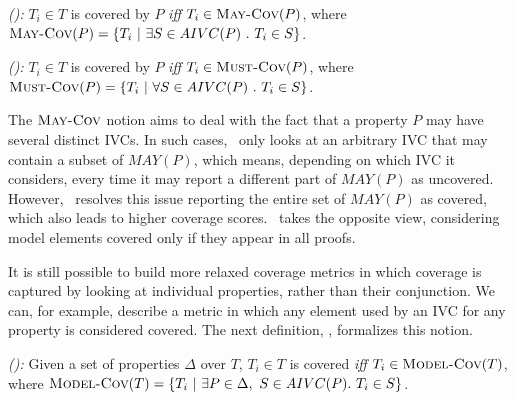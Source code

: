 \begin{definition} {\emph{(\maycov):}}
  \label{def:comp-1}
 $T_i \in T$ is covered by $P$ \emph{iff} $T_i \in \text{\sc May-Cov} (P)$, where
   $\text{\sc May-Cov} (P) = \{T_i ~|~ \exists S \in AIVC(P)~.~T_i \in S \}$.
\end{definition}

\begin{definition} {\emph{(\mustcov):}}
  \label{def:mustcov}
 $T_i \in T$ is covered by $P$ \emph{iff} $T_i \in \text{\sc Must-Cov} (P)$, where
   $\text{\sc Must-Cov} (P) = \{T_i ~|~ \forall S \in AIVC(P)~.~T_i \in S \}$.
\end{definition}

The $\text{\sc May-Cov}$ notion aims to deal with the fact that a property $P$ may have
several distinct IVCs. In such cases, \ivccov\ only looks at an arbitrary IVC
that may contain a subset of $MAY(P)$, which means, depending on
which IVC it considers, every time it may report a different part of $MAY(P)$
as uncovered. However, \maycov\ resolves this issue reporting the entire set of $MAY(P)$ as covered, which also leads to higher coverage scores.  \mustcov\ takes the opposite view, considering model elements covered only if they appear in all proofs.


It is still possible to build more relaxed coverage metrics in which coverage
is captured by looking at individual properties, rather than their conjunction.
We can, for example, describe a metric in which any element used by an IVC for any property is considered covered.
%
The next definition, \allcov, formalizes this notion.

\begin{definition} {\emph{(\allcov):}}
  \label{def:comp-2}
     Given a set of properties $\Delta$ over $T$, $T_i \in T$ is covered
   \emph{iff} $T_i \in \text{\sc Model-Cov} (T)$, where
   $\text{\sc Model-Cov} (T) = \{T_i ~|~ \exists P \in \Delta ,~ S \in AIVC(P).~T_i \in S \}$.
\end{definition}


